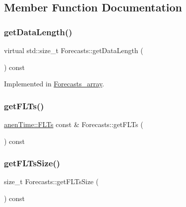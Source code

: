 \subsection{Member Function Documentation}
\mbox{\label{class_forecasts_aeafd542ddff2fc678440d555002dc912}} 
\subsubsection{\texorpdfstring{get\+Data\+Length()}{getDataLength()}}
{\footnotesize\ttfamily virtual std\+::size\+\_\+t Forecasts\+::get\+Data\+Length (\begin{DoxyParamCaption}{ }\end{DoxyParamCaption}) const\hspace{0.3cm}{\ttfamily [pure virtual]}}



Implemented in \mbox{\hyperlink{class_forecasts__array_aae8790581dc2f2dcfc140c34999588e0}{Forecasts\+\_\+array}}.

\mbox{\label{class_forecasts_a3762d8a919986b5874291dfc528303a1}} 
\subsubsection{\texorpdfstring{get\+F\+L\+Ts()}{getFLTs()}}
{\footnotesize\ttfamily \mbox{\hyperlink{classanen_time_1_1_f_l_ts}{anen\+Time\+::\+F\+L\+Ts}} const  \& Forecasts\+::get\+F\+L\+Ts (\begin{DoxyParamCaption}{ }\end{DoxyParamCaption}) const}

\mbox{\label{class_forecasts_a3e54c52233da87a7868a95e83b7e5ff7}} 
\subsubsection{\texorpdfstring{get\+F\+L\+Ts\+Size()}{getFLTsSize()}}
{\footnotesize\ttfamily size\+\_\+t Forecasts\+::get\+F\+L\+Ts\+Size (\begin{DoxyParamCaption}{ }\end{DoxyParamCaption}) const}

